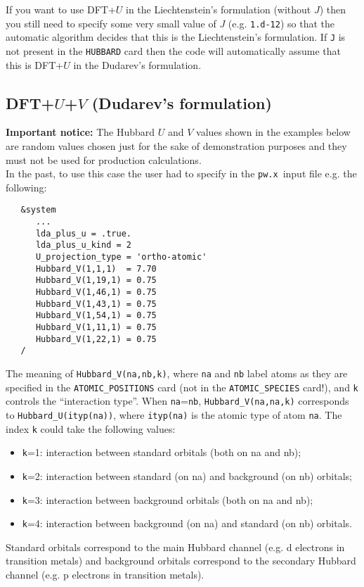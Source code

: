 \documentclass[12pt,a4paper]{article}
\def\pw{\texttt{pw.x}}
\begin{document}
\noindent
If you want to use DFT+$U$ in the Liechtenstein's formulation (without $J$) then you still need to specify some very small value of $J$ (e.g. \texttt{1.d-12}) so that the automatic algorithm decides that this is the Liechtenstein's formulation. If \texttt{J} is not present in the \texttt{HUBBARD} card then the code will automatically assume that this is DFT+$U$ in the Dudarev's formulation.

\subsection{DFT+$U$+$V$ (Dudarev's formulation)}

\textbf{Important notice:} The Hubbard $U$ and $V$ values shown in the examples below are random values chosen just for the sake of demonstration purposes and they must not be used for production calculations.\\ 

\noindent
In the past, to use this case the user had to specify in the \pw\ input file e.g. the following:
%
\noindent
\begin{verbatim}
   &system
      ...
      lda_plus_u = .true.
      lda_plus_u_kind = 2
      U_projection_type = 'ortho-atomic'
      Hubbard_V(1,1,1)  = 7.70
      Hubbard_V(1,19,1) = 0.75
      Hubbard_V(1,46,1) = 0.75
      Hubbard_V(1,43,1) = 0.75
      Hubbard_V(1,54,1) = 0.75
      Hubbard_V(1,11,1) = 0.75
      Hubbard_V(1,22,1) = 0.75
   /
\end{verbatim}
%
The meaning of \texttt{Hubbard\_V(na,nb,k)}, where \texttt{na} and \texttt{nb} label atoms as they are specified in the \texttt{ATOMIC\_POSITIONS} card (not in the \texttt{ATOMIC\_SPECIES} card!), and \texttt{k} controls the ``interaction type''. When \texttt{na}=\texttt{nb}, \texttt{Hubbard\_V(na,na,k)} corresponds to \texttt{Hubbard\_U(ityp(na))}, where \texttt{ityp(na)} is the atomic type of atom \texttt{na}. The index \texttt{k} could take the following values:
\begin{itemize}
    \item \texttt{k}=1: interaction between standard orbitals (both on na and nb);
    \item \texttt{k}=2: interaction between standard (on na) and background (on nb) orbitals;
    \item \texttt{k}=3: interaction between background orbitals (both on na and nb);
    \item \texttt{k}=4: interaction between background (on na) and standard (on nb) orbitals.
\end{itemize}
Standard orbitals correspond to the main Hubbard channel (e.g. d electrons in transition metals) and background orbitals correspond to the secondary Hubbard channel (e.g. p electrons in transition metals).\\
\end{document}
